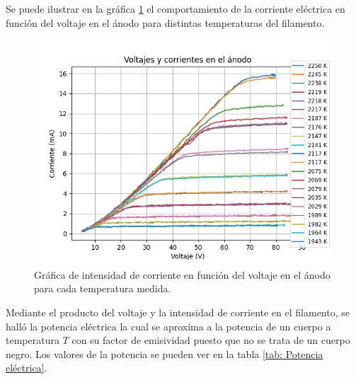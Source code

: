 \documentclass[%
 reprint,
 amsmath,amssymb,
 aps,
]{revtex4-2}
\begin{document}
\vspace{0.2 cm}
Se puede ilustrar en la gráfica \ref{fig: Gráfica de Voltaje vs Corriente ánodo} el comportamiento de la corriente eléctrica en función del voltaje en el ánodo para distintas temperaturas del filamento.

\begin{figure}[H]
    \centering
    \includegraphics[width= 1\linewidth]{graficas/Gráfica de Voltaje vs Corriente ánodo.png}
    \caption{Gráfica de intensidad de corriente en función del voltaje en el ánodo para cada temperatura medida.}
    \label{fig: Gráfica de Voltaje vs Corriente ánodo}
\end{figure}

\vspace{0.2 cm}
Mediante el producto del voltaje y la intensidad de corriente en el filamento, se halló la potencia eléctrica la cual se aproxima a la potencia de un cuerpo a temperatura $T$ con su factor de emisividad puesto que no se trata de un cuerpo negro. Los valores de la potencia se pueden ver en la tabla \ref{tab: Potencia eléctrica}.
\end{document}
